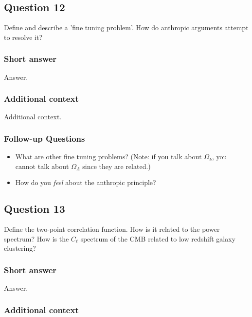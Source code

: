 \documentclass[a4paper,11pt]{article}
\begin{document}
\newpage
\subsection{Question 12}

Define and describe a 'fine tuning problem'. How do anthropic arguments attempt to resolve it?

\subsubsection{Short answer}

Answer.

\subsubsection{Additional context}

Additional context.

\subsubsection{Follow-up Questions}

\begin{itemize}
    \item What are other fine tuning problems? (Note: if you talk about $\Omega_k$, you cannot talk about $\Omega_\Lambda$ since they are related.)
    \item How do you \textit{feel} about the anthropic principle?
\end{itemize}


%
%

\newpage
\subsection{Question 13}

Define the two-point correlation function. How is it related to the power spectrum? How is the $C_\ell$ spectrum of the CMB related to low redshift galaxy clustering?

\subsubsection{Short answer}

Answer.

\subsubsection{Additional context}
\end{document}
